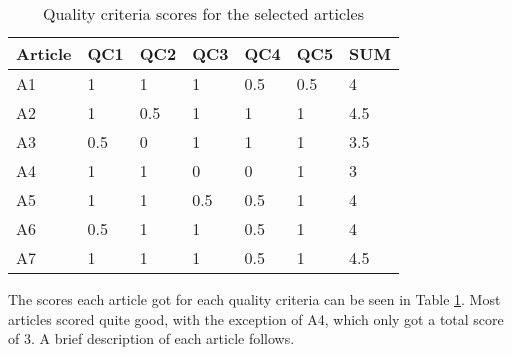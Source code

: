 \begin{table}[h]
\centering
\begin{tabular}{|l|l|l|l|l|l|l|} \hline
Article & QC1 	& QC2 	& QC3 	& QC4 	& QC5 	& SUM \\ \hline
A1 		& 1 	& 1 	& 1 	& 0.5 	& 0.5 	& 4\\ \hline
A2 		& 1 	& 0.5 	& 1 	& 1 	& 1 	& 4.5\\ \hline
A3 		& 0.5 	& 0 	& 1 	& 1 	& 1 	& 3.5\\ \hline
A4 		& 1 	& 1 	& 0 	& 0 	& 1 	& 3\\ \hline
A5 		& 1 	& 1 	& 0.5 	& 0.5 	& 1 	& 4\\ \hline
A6 		& 0.5	& 1 	& 1 	& 0.5 	& 1 	& 4\\ \hline
A7 		& 1 	& 1 	& 1 	& 0.5 	& 1 	& 4.5\\ \hline
\end{tabular}
\caption{Quality criteria scores for the selected articles}
\label{qcscore}
\end{table}


The scores each article got for each quality criteria can be seen in Table \ref{qcscore}. Most articles scored quite good, with the exception of A4, which only got a total score of 3. A brief description of each article follows.

